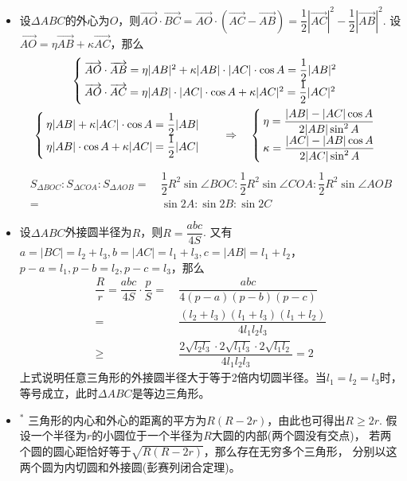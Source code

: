 \begin{itemize}[leftmargin=\inteval{\myitemleftmargin}pt,itemsep=
   \inteval{\myitemitempsep}pt,topsep=\inteval{\myitemtopsep}pt]
\item 设$ \Delta ABC $的外心为$ O $，则$ \vec{AO} \cdot \vec{BC}=
\vec{AO}\cdot (\vec{AC}-\vec{AB})=
\dfrac{1}{2}|\vec{AC}|^2-\dfrac{1}{2}|\vec{AB}|^2. $ 
设$ \vec{AO}=\eta\vec{AB}+\kappa\vec{AC} $，那么 
\begin{gather*}
\begin{cases}
    \overrightarrow{AO}\cdot\overrightarrow{AB}=\eta |AB|^2+\kappa |AB|
    \cdot |AC|\cdot\cos A=\dfrac{1}{2}|AB|^2 \\
    \overrightarrow{AO}\cdot\overrightarrow{AC}=\eta |AB|\cdot |AC|\cdot\cos A+\kappa 
    |AC|^2=\dfrac{1}{2}|AC|^2 
\end{cases} \\
\begin{cases}
    \eta |AB|+\kappa |AC|\cdot\cos A=\dfrac{1}{2}|AB| \\
    \eta |AB|\cdot \cos A+\kappa |AC|=\dfrac{1}{2}|AC| 
\end{cases}\quad \Rightarrow \quad
\begin{cases}
    \eta=\dfrac{|AB|-|AC|\cos A}{2|AB|\sin^2 A} \\
    \kappa=\dfrac{|AC|-|AB|\cos A}{2|AC|\sin^2 A} 
\end{cases}
\end{gather*}
\begin{align*}
    S_{\Delta BOC}:S_{\Delta COA}:S_{\Delta AOB} =&\ \dfrac{1}{2}R^2 
    \sin\angle BOC:\dfrac{1}{2}R^2\sin\angle COA:
    \dfrac{1}{2}R^2\sin\angle AOB \\ =&\ \sin 2A:\sin 2B:\sin 2C
\end{align*}
\item 设$ \Delta ABC $外接圆半径为$ R $，则$ R=\dfrac{abc}{4S} $. 
又有$ a=|BC|=l_2+l_3,b=|AC|=l_1+l_3,c=|AB|=l_1+l_2 $，
$ p-a=l_1,p-b=l_2,p-c=l_3 $，那么
\begin{align*}
    \dfrac{R}{r}=\dfrac{abc}{4S}\cdot \dfrac{p}{S}
    =&\ \dfrac{abc}{4(p-a)(p-b)(p-c)} \\
    =&\ \dfrac{(l_2+l_3)(l_1+l_3)(l_1+l_2)}{4l_1l_2l_3} \\
    \geq &\ \dfrac{2\sqrt{l_2l_3}\cdot 2\sqrt{l_1l_3}\cdot 2\sqrt{l_1l_2}}{4l_1l_2l_3}=2
\end{align*}
上式说明任意三角形的外接圆半径大于等于2倍内切圆半径。当$ l_1=l_2=l_3 $时，
等号成立，此时$ \Delta ABC $是等边三角形。

\item $^*$ 三角形的内心和外心的距离的平方为$ R(R-2r) $，由此也可得出$ R\geq 2r $.
假设一个半径为$ r $的小圆位于一个半径为$ R $大圆的内部(两个圆没有交点)，
若两个圆的圆心距恰好等于$ \sqrt{R(R-2r)} $，那么存在无穷多个三角形，
分别以这两个圆为内切圆和外接圆(彭赛列闭合定理)。


\end{itemize}
